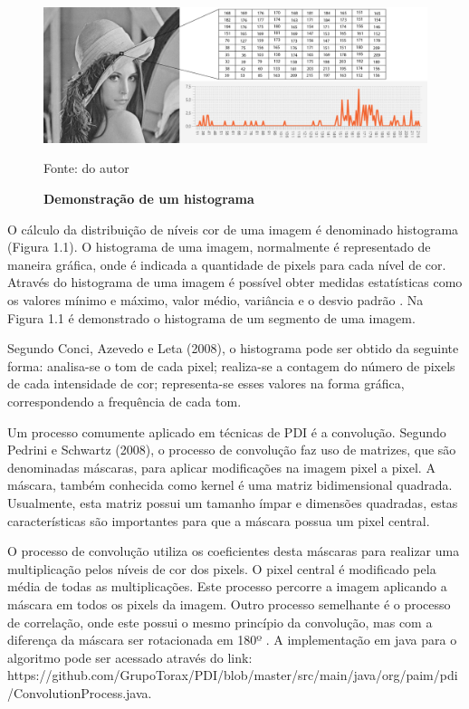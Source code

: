 \documentclass[
	12pt,				%
	oneside,			%
	a4paper,			%
	english,			%
	french,				%
	spanish,			%
	brazil,				%
	]{abntex2}
\begin{document}
\begin{figure}[ht]
\centering
\label{fig:histograma}
\caption{\textbf{Demonstração de um histograma}}
\includegraphics[width=1\textwidth]{imagens/histograma.png}

Fonte: do autor
\end{figure}

O cálculo da distribuição de níveis cor de uma imagem é denominado histograma (Figura 1.1). O histograma de uma imagem, normalmente é representado de maneira gráfica, onde é indicada a quantidade de pixels para cada nível de cor. Através do histograma de uma imagem é possível obter medidas estatísticas como os valores mínimo e máximo, valor médio, variância e o desvio padrão \cite{gonzalesWoods:2008}. Na Figura 1.1 é demonstrado o histograma de um segmento de uma imagem. 

Segundo Conci, Azevedo e Leta (2008), o histograma pode ser obtido da seguinte forma: analisa-se o tom de cada pixel; realiza-se a contagem do número de pixels de cada intensidade de cor; representa-se esses valores na forma gráfica, correspondendo a frequência de cada tom.

Um processo comumente aplicado em técnicas de PDI é a convolução. Segundo Pedrini e Schwartz (2008), o processo de convolução faz uso de matrizes, que são denominadas máscaras, para aplicar modificações na imagem pixel a pixel. A máscara, também conhecida como kernel é uma matriz bidimensional quadrada. Usualmente, esta matriz possui um tamanho ímpar e dimensões quadradas, estas características são importantes para que a máscara possua um pixel central.

O processo de convolução utiliza os coeficientes desta máscaras para realizar uma multiplicação pelos níveis de cor dos pixels. O pixel central é modificado pela média de todas as multiplicações. Este processo percorre a imagem aplicando a máscara em todos os pixels da imagem. Outro processo semelhante é o processo de correlação, onde este possui o mesmo princípio da convolução, mas com a diferença da máscara ser rotacionada em 180º \cite{gonzalesWoods:2008}. A implementação em java para o algoritmo pode ser acessado através do link: https://github.com/GrupoTorax/PDI/blob/master/src/main/java/org/paim/pdi/ConvolutionProcess.java.
\end{document}
